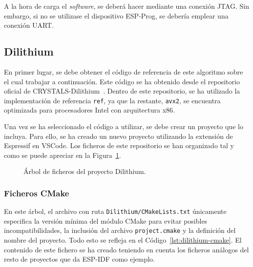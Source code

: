 A la hora de carga el \textit{software}, se deberá hacer mediante una conexión JTAG.
Sin embargo, si no se utilizase el dispositivo ESP-Prog, se debería emplear una conexión \ac{UART}.


\subsection{Dilithium}\label{subsec:dilithium}

En primer lugar, se debe obtener el código de referencia de este algoritmo sobre el cual trabajar a continuación.
Este código se ha obtenido desde el repositorio oficial de CRYSTALS-Dilithium~\cite{github-dilithium}.
Dentro de este repositorio, se ha utilizado la implementación de referencia \texttt{ref}, ya que la restante, \texttt{avx2}, se encuentra optimizada para procesadores Intel con arquitectura x86.

Una vez se ha seleccionado el código a utilizar, se debe crear un proyecto que lo incluya.
Para ello, se ha creado un nuevo proyecto utilizando la extensión de Espressif en VSCode.
Los ficheros de este repositorio se han organizado tal y como se puede apreciar en la Figura~\ref{tree:dilithium}.

\begin{figure}[H]
\centering
{}
\caption{Árbol de ficheros del proyecto Dilithium.}
\label{tree:dilithium}
\end{figure}

\subsubsection{Ficheros CMake}\label{subsubsec:dilithium-cmake}

En este árbol, el archivo con ruta \texttt{Dilithium/CMakeLists.txt} únicamente especifica la versión mínima del módulo CMake para evitar posibles incompatibilidades, la inclusión del archivo \texttt{project.cmake} y la definición del nombre del proyecto.
Todo esto se refleja en el Código~\ref{lst:dilithium-cmake}.
El contenido de este fichero se ha creado teniendo en cuenta los ficheros análogos del resto de proyectos que da ESP-IDF como ejemplo.

